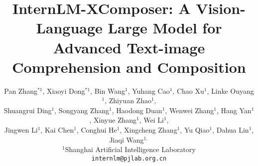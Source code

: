 \documentclass[10pt,twocolumn,letterpaper]{article}
\begin{document}
\title{InternLM-XComposer: A Vision-Language Large Model for \\ Advanced Text-image Comprehension and Composition}

\author{Pan Zhang$^{*1}$, Xiaoyi Dong$^{*1}$, Bin Wang$^{1}$, Yuhang Cao$^{1}$, Chao Xu$^{1}$, Linke Ouyang$^{1}$, Zhiyuan Zhao$^{1}$, \\ Shuangrui Ding$^{1}$, Songyang Zhang$^{1}$, Haodong Duan$^{1}$, Wenwei Zhang$^{1}$, Hang Yan$^{1}$, Xinyue Zhang$^{1}$, Wei Li$^{1}$, \\ Jingwen Li$^{1}$,
Kai Chen$^{1}$, Conghui He$^{1}$, Xingcheng Zhang$^{1}$, Yu Qiao$^{1}$, Dahua Lin$^{1}$, Jiaqi Wang$^{1,}${\textsuperscript{\Letter}}\\
$^1$Shanghai Artificial Intelligence Laboratory \\
\tt\small
internlm@pjlab.org.cn
}

 \maketitle


{\let\thefootnote\relax{}}
\end{document}
